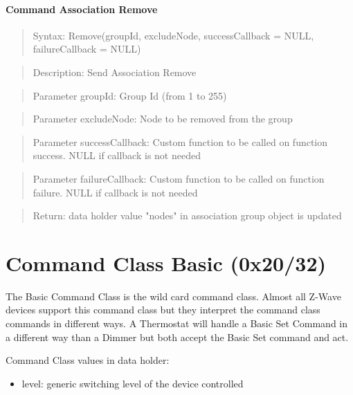 \paragraph {Command Association Remove}
\begin{quote} Syntax: Remove(groupId, excludeNode, successCallback = NULL, failureCallback = NULL)\end{quote}
\begin{quote} Description: Send Association Remove\end{quote}
\begin{quote} Parameter groupId: Group Id (from 1 to 255)\end{quote}
\begin{quote} Parameter excludeNode: Node to be removed from the group\end{quote}
\begin{quote} Parameter successCallback: Custom function to be called on function success. NULL if callback is not needed\end{quote}
\begin{quote} Parameter failureCallback: Custom function to be called on function failure. NULL if callback is not needed\end{quote}
\begin{quote} Return: data holder value "nodes" in association group object is  updated \end{quote}
 

\section{Command Class Basic (0x20/32)}

The Basic Command Class is the wild card command class. Almost all Z-Wave devices support this command class 
but they interpret the command class commands in different ways. A Thermostat will handle a Basic Set Command 
in a different way than a Dimmer but both accept the Basic Set command and act.

Command Class values in data holder:
\begin{itemize}
\item level: generic switching level of the device controlled
\end{itemize}


